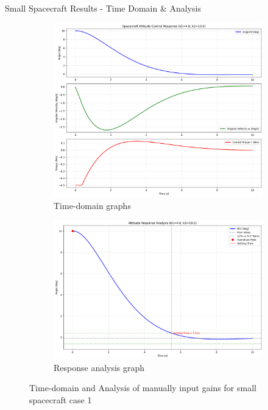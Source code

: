 \documentclass{beamer}
\begin{document}
\begin{frame}{Small Spacecraft Results - Time Domain \& Analysis}
    \begin{figure}[H]
    \label{Fig. 1}
    \centering
    \begin{subfigure}[b]{0.48\columnwidth}
        \label{Fig. 1.A}
        \centering
        \includegraphics[width=\linewidth]{base_time_domain(4).pdf}
        \caption{Time-domain graphs}
        \label{fig:subfig1}
    \end{subfigure}
    \hfill
    \begin{subfigure}[b]{0.48\columnwidth}
        \label{Fig. 1.B}
        \centering
        \includegraphics[width=\linewidth]{base_analysis(4).pdf}
        \caption{Response analysis graph}
        \label{fig:subfig2}
    \end{subfigure}
    \caption{Time-domain and Analysis of manually input gains for small spacecraft case 1}
    \label{fig:combined}
\end{figure}
\end{frame}
\end{document}
